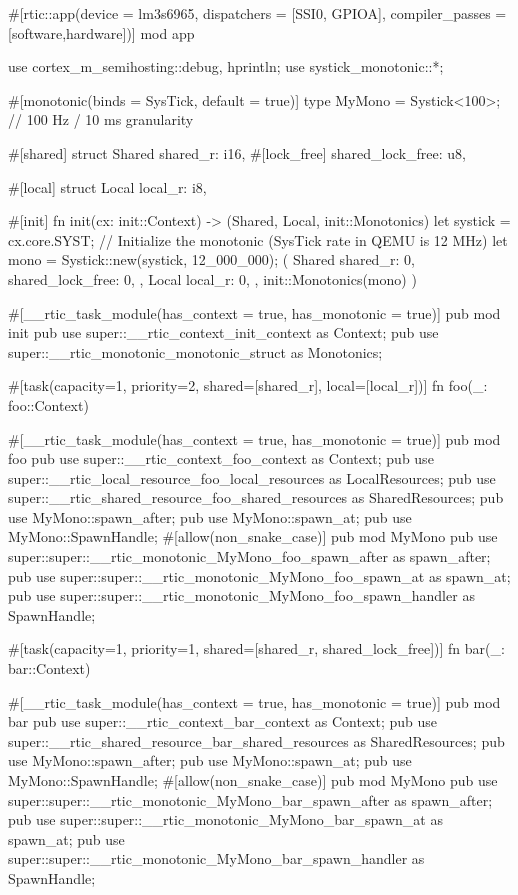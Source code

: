 #[rtic::app(device = lm3s6965, dispatchers = [SSI0, GPIOA], 
    compiler_passes = [software,hardware])]
mod app {
    use cortex_m_semihosting::{debug, hprintln};
    use systick_monotonic::*;

    #[monotonic(binds = SysTick, default = true)]
    type MyMono = Systick<100>; // 100 Hz / 10 ms granularity

    #[shared]
    struct Shared {
        shared_r: i16,
        #[lock_free]
        shared_lock_free: u8,
    }

    #[local]
    struct Local {
        local_r: i8,
    }

    #[init]
    fn init(cx: init::Context) -> (Shared, Local, init::Monotonics) {
        let systick = cx.core.SYST;
        // Initialize the monotonic (SysTick rate in QEMU is 12 MHz)
        let mono = Systick::new(systick, 12_000_000);
        (
            Shared {
                shared_r: 0,
                shared_lock_free: 0,
            }, 
            Local {
                local_r: 0,
            }, 
            init::Monotonics(mono)
        )
    }
    
    #[__rtic_task_module(has_context = true, has_monotonic = true)]
    pub mod init {
        pub use super::__rtic_context_init_context as Context;
        pub use super::__rtic_monotonic_monotonic_struct as Monotonics;
    }

    #[task(capacity=1, priority=2, shared=[shared_r], local=[local_r])]
    fn foo(_: foo::Context) {
    }
    
    #[__rtic_task_module(has_context = true, has_monotonic = true)]
    pub mod foo {
        pub use super::__rtic_context_foo_context as Context;
        pub use super::__rtic_local_resource_foo_local_resources as LocalResources;
        pub use super::__rtic_shared_resource_foo_shared_resources as SharedResources;
        pub use MyMono::spawn_after;
        pub use MyMono::spawn_at;
        pub use MyMono::SpawnHandle;
        #[allow(non_snake_case)]
        pub mod MyMono {
            pub use super::super::__rtic_monotonic_MyMono_foo_spawn_after as spawn_after;
            pub use super::super::__rtic_monotonic_MyMono_foo_spawn_at as spawn_at;
            pub use super::super::__rtic_monotonic_MyMono_foo_spawn_handler as SpawnHandle;
        }
    }

    #[task(capacity=1, priority=1, shared=[shared_r, shared_lock_free])]
    fn bar(_: bar::Context) {
    }
    
    #[__rtic_task_module(has_context = true, has_monotonic = true)]
    pub mod bar {
        pub use super::__rtic_context_bar_context as Context;
        pub use super::__rtic_shared_resource_bar_shared_resources as SharedResources;
        pub use MyMono::spawn_after;
        pub use MyMono::spawn_at;
        pub use MyMono::SpawnHandle;
        #[allow(non_snake_case)]
        pub mod MyMono {
            pub use super::super::__rtic_monotonic_MyMono_bar_spawn_after as spawn_after;
            pub use super::super::__rtic_monotonic_MyMono_bar_spawn_at as spawn_at;
            pub use super::super::__rtic_monotonic_MyMono_bar_spawn_handler as SpawnHandle;
        }
    }

}
